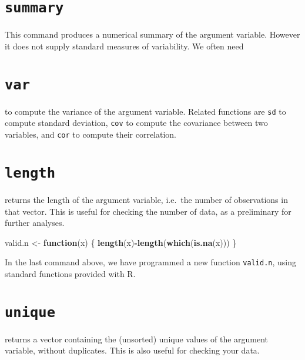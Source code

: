 \documentclass[]{book}
\newenvironment{Shaded}{\begin{snugshade}}{\end{snugshade}}
\newcommand{\ControlFlowTok}[1]{\textcolor[rgb]{0.13,0.29,0.53}{\textbf{#1}}}
\newcommand{\KeywordTok}[1]{\textcolor[rgb]{0.13,0.29,0.53}{\textbf{#1}}}
\newcommand{\NormalTok}[1]{#1}
\newcommand{\OperatorTok}[1]{\textcolor[rgb]{0.81,0.36,0.00}{\textbf{#1}}}
\newcommand{\StringTok}[1]{\textcolor[rgb]{0.31,0.60,0.02}{#1}}
\begin{document}
\hypertarget{summary-1}{%
\section{\texorpdfstring{\texttt{summary}}{summary}}\label{summary-1}}

This command produces a numerical summary of the argument variable.
However it does not supply standard measures of variability. We
often need

\hypertarget{var}{%
\section{\texorpdfstring{\texttt{var}}{var}}\label{var}}

to compute the variance of the argument variable. Related functions
are \texttt{sd} to compute standard deviation,
\texttt{cov} to compute the covariance between two
variables, and \texttt{cor} to compute their
correlation.

\hypertarget{length}{%
\section{\texorpdfstring{\texttt{length}}{length}}\label{length}}

returns the length of the argument variable, i.e.~the number of
observations in that vector. This is useful for checking the number
of data, as a preliminary for further analyses.

\begin{Shaded}
\begin{Highlighting}[]
\NormalTok{valid.n <-}\StringTok{ }\ControlFlowTok{function}\NormalTok{(x) \{ }
  \KeywordTok{length}\NormalTok{(x)}\OperatorTok{-}\KeywordTok{length}\NormalTok{(}\KeywordTok{which}\NormalTok{(}\KeywordTok{is.na}\NormalTok{(x))) }
\NormalTok{  \}}
\end{Highlighting}
\end{Shaded}

In the last command above, we have programmed a new function
\texttt{valid.n}, using standard functions provided
with R.

\hypertarget{unique}{%
\section{\texorpdfstring{\texttt{unique}}{unique}}\label{unique}}

returns a vector containing the (unsorted) unique values of the
argument variable, without duplicates. This is also useful for
checking your data.
\end{document}
